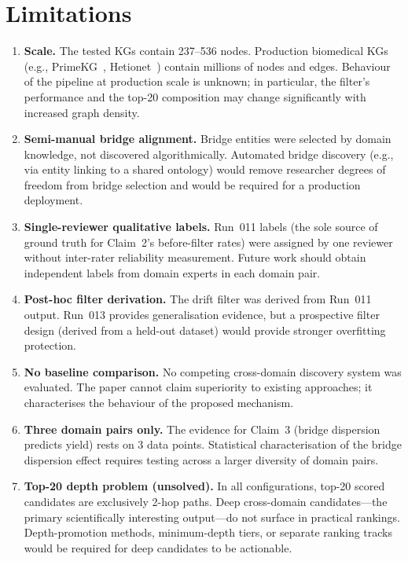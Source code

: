 \section{Limitations}
\label{sec:limitations}

\begin{enumerate}[leftmargin=*, label=\textbf{L\arabic*.}]

\item \textbf{Scale.}
The tested KGs contain 237--536 nodes.
Production biomedical KGs (e.g., PrimeKG~\cite{TODO-PrimeKG},
Hetionet~\cite{TODO-Hetionet}) contain millions of nodes and edges.
Behaviour of the pipeline at production scale is unknown; in particular,
the filter's performance and the top-20 composition may change significantly
with increased graph density.

\item \textbf{Semi-manual bridge alignment.}
Bridge entities were selected by domain knowledge, not discovered algorithmically.
Automated bridge discovery (e.g., via entity linking to a shared ontology) would
remove researcher degrees of freedom from bridge selection and would be required
for a production deployment.

\item \textbf{Single-reviewer qualitative labels.}
Run~011 labels (the sole source of ground truth for Claim~2's before-filter rates)
were assigned by one reviewer without inter-rater reliability measurement.
Future work should obtain independent labels from domain experts in each domain pair.

\item \textbf{Post-hoc filter derivation.}
The drift filter was derived from Run~011 output.
Run~013 provides generalisation evidence, but a prospective filter design
(derived from a held-out dataset) would provide stronger overfitting protection.

\item \textbf{No baseline comparison.}
No competing cross-domain discovery system was evaluated.
The paper cannot claim superiority to existing approaches; it characterises
the behaviour of the proposed mechanism.

\item \textbf{Three domain pairs only.}
The evidence for Claim~3 (bridge dispersion predicts yield) rests on 3 data points.
Statistical characterisation of the bridge dispersion effect requires testing
across a larger diversity of domain pairs.

\item \textbf{Top-20 depth problem (unsolved).}
In all configurations, top-20 scored candidates are exclusively 2-hop paths.
Deep cross-domain candidates---the primary scientifically interesting output---do not
surface in practical rankings.
Depth-promotion methods, minimum-depth tiers, or separate ranking tracks would be
required for deep candidates to be actionable.


\end{enumerate}
